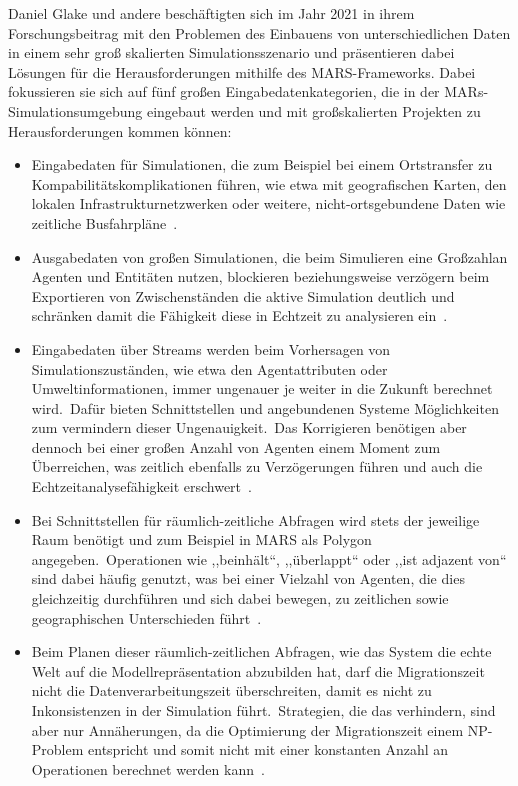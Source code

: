 Daniel Glake und andere beschäftigten sich im Jahr 2021 in ihrem Forschungsbeitrag mit den Problemen des Einbauens von unterschiedlichen Daten in einem sehr groß skalierten Simulationsszenario und präsentieren dabei Lösungen für die Herausforderungen mithilfe des MARS-Frameworks.
Dabei fokussieren sie sich auf fünf großen Eingabedatenkategorien, die in der MARs-Simulationsumgebung eingebaut werden und mit großskalierten Projekten zu Herausforderungen kommen können:
\begin{itemize}
    \item Eingabedaten für Simulationen, die zum Beispiel bei einem Ortstransfer zu Kompabilitätskomplikationen führen, wie etwa mit geografischen Karten, den lokalen Infrastrukturnetzwerken oder weitere, nicht-ortsgebundene Daten wie zeitliche Busfahrpläne~\cite{Glake2021}.
    \item Ausgabedaten von großen Simulationen, die beim Simulieren eine Großzahlan Agenten und Entitäten nutzen, blockieren beziehungsweise verzögern beim Exportieren von Zwischenständen die aktive Simulation deutlich und schränken damit die Fähigkeit diese in Echtzeit zu analysieren ein~\cite{Glake2021}.
    \item Eingabedaten über Streams werden beim Vorhersagen von Simulationszuständen, wie etwa den Agentattributen oder Umweltinformationen, immer ungenauer je weiter in die Zukunft berechnet wird.~Dafür bieten Schnittstellen und angebundenen Systeme Möglichkeiten zum vermindern dieser Ungenauigkeit.~Das Korrigieren benötigen aber dennoch bei einer großen Anzahl von Agenten einem Moment zum Überreichen, was zeitlich ebenfalls zu Verzögerungen führen und auch die Echtzeitanalysefähigkeit erschwert~\cite{Glake2021}.
    \item Bei Schnittstellen für räumlich-zeitliche Abfragen wird stets der jeweilige Raum benötigt und zum Beispiel in MARS als Polygon angegeben.~Operationen wie ,,beinhält``, ,,überlappt`` oder ,,ist adjazent von`` sind dabei häufig genutzt, was bei einer Vielzahl von Agenten, die dies gleichzeitig durchführen und sich dabei bewegen, zu zeitlichen sowie geographischen Unterschieden führt~\cite{Glake2021}.
    \item Beim Planen dieser räumlich-zeitlichen Abfragen, wie das System die echte Welt auf die Modellrepräsentation abzubilden hat, darf die Migrationszeit nicht die Datenverarbeitungszeit überschreiten, damit es nicht zu Inkonsistenzen in der Simulation führt.~Strategien, die das verhindern, sind aber nur Annäherungen, da die Optimierung der Migrationszeit einem NP-Problem entspricht und somit nicht mit einer konstanten Anzahl an Operationen berechnet werden kann~\cite{Glake2021}.
\end{itemize}

